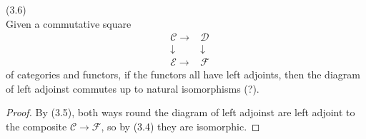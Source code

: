 \documentclass[a4paper]{article}
\begin{document}
\begin{coro} (3.6)\\
    Given a commutative square
    \begin{equation*}
        \begin{aligned}
            &\mathcal{C}\to &\mathcal{D}\\
            &\downarrow & \downarrow\\
            &\mathcal{E} \to &\mathcal{F}
        \end{aligned}
    \end{equation*}
    of categories and functors, if the functors all have left adjoints, then the diagram of left adjoinst commutes up to natural isomorphisms (?).
    \begin{proof}
        By (3.5), both ways round the diagram of left adjoinst are left adjoint to the composite $\mathcal{C} \to \mathcal{F}$, so by (3.4) they are isomorphic.
    \end{proof}
\end{coro}
\end{document}
